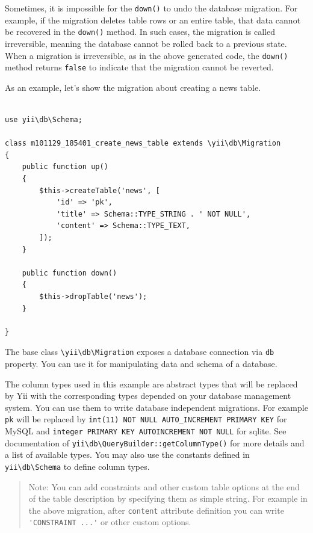 Sometimes, it is impossible for the \lstinline|down()| to undo the database migration. For example, if the migration deletes
table rows or an entire table, that data cannot be recovered in the \lstinline|down()| method. In such
cases, the migration is called irreversible, meaning the database cannot be rolled back to
a previous state. When a migration is irreversible, as in the above generated code, the \lstinline|down()|
method returns \lstinline|false| to indicate that the migration cannot be reverted.

As an example, let's show the migration about creating a news table.

\lstset{language=php}\begin{lstlisting}

use yii\db\Schema;

class m101129_185401_create_news_table extends \yii\db\Migration
{
    public function up()
    {
        $this->createTable('news', [
            'id' => 'pk',
            'title' => Schema::TYPE_STRING . ' NOT NULL',
            'content' => Schema::TYPE_TEXT,
        ]);
    }

    public function down()
    {
        $this->dropTable('news');
    }

}
\end{lstlisting}
The base class \texttt{{\allowbreak{}\textbackslash}yii{\allowbreak{}\textbackslash}db{\allowbreak{}\textbackslash}Migration} exposes a database connection via \lstinline|db|
property. You can use it for manipulating data and schema of a database.

The column types used in this example are abstract types that will be replaced
by Yii with the corresponding types depended on your database management system.
You can use them to write database independent migrations.
For example \lstinline|pk| will be replaced by \lstinline|int(11) NOT NULL AUTO_INCREMENT PRIMARY KEY|
for MySQL and \lstinline|integer PRIMARY KEY AUTOINCREMENT NOT NULL| for sqlite.
See documentation of \texttt{yii{\allowbreak{}\textbackslash}db{\allowbreak{}\textbackslash}QueryBuilder\allowbreak{}::\allowbreak{}getColumnType()} for more details and a list
of available types. You may also use the constants defined in \texttt{yii{\allowbreak{}\textbackslash}db{\allowbreak{}\textbackslash}Schema} to
define column types.

\begin{quote}Note: You can add constraints and other custom table options at the end of the table description by
specifying them as simple string. For example in the above migration, after \lstinline|content| attribute definition
you can write \lstinline|'CONSTRAINT ...'| or other custom options.

\end{quote}
